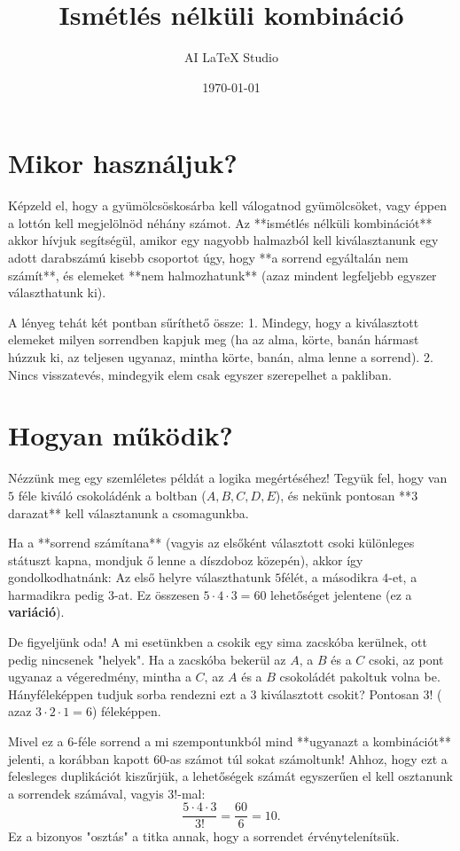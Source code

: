 \documentclass[a4paper,12pt]{article}
\title{Ismétlés nélküli kombináció}
\author{AI LaTeX Studio}
\date{\today}
\theoremstyle{definition} %
\begin{document}
\maketitle

\section{Mikor használjuk?}
Képzeld el, hogy a gyümölcsöskosárba kell válogatnod gyümölcsöket, vagy éppen a lottón kell megjelölnöd néhány számot. Az **ismétlés nélküli kombinációt** akkor hívjuk segítségül, amikor egy nagyobb halmazból kell kiválasztanunk egy adott darabszámú kisebb csoportot úgy, hogy **a sorrend egyáltalán nem számít**, és elemeket **nem halmozhatunk** (azaz mindent legfeljebb egyszer választhatunk ki). 

A lényeg tehát két pontban sűríthető össze: 
1. Mindegy, hogy a kiválasztott elemeket milyen sorrendben kapjuk meg (ha az alma, körte, banán hármast húzzuk ki, az teljesen ugyanaz, mintha körte, banán, alma lenne a sorrend).
2. Nincs visszatevés, mindegyik elem csak egyszer szerepelhet a pakliban.

\section{Hogyan működik?}
Nézzünk meg egy szemléletes példát a logika megértéséhez! Tegyük fel, hogy van $5$ féle kiváló csokoládénk a boltban ($A, B, C, D, E$), és nekünk pontosan **$3$ darazat** kell választanunk a csomagunkba. 

Ha a **sorrend számítana** (vagyis az elsőként választott csoki különleges státuszt kapna, mondjuk ő lenne a díszdoboz közepén), akkor így gondolkodhatnánk:
Az első helyre választhatunk $5$félét, a másodikra $4$-et, a harmadikra pedig $3$-at. Ez összesen $5 \cdot 4 \cdot 3 = 60$ lehetőséget jelentene (ez a \textbf{variáció}).

De figyeljünk oda! A mi esetünkben a csokik egy sima zacskóba kerülnek, ott pedig nincsenek "helyek". Ha a zacskóba bekerül az $A$, a $B$ és a $C$ csoki, az pont ugyanaz a végeredmény, mintha a $C$, az $A$ és a $B$ csokoládét pakoltuk volna be. Hányféleképpen tudjuk sorba rendezni ezt a $3$ kiválasztott csokit? Pontosan $3!$ ( azaz $3 \cdot 2 \cdot 1 = 6$) féleképpen. 

Mivel ez a $6$-féle sorrend a mi szempontunkból mind **ugyanazt a kombinációt** jelenti, a korábban kapott $60$-as számot túl sokat számoltunk! Ahhoz, hogy ezt a felesleges duplikációt kiszűrjük, a lehetőségek számát egyszerűen el kell osztanunk a sorrendek számával, vagyis $3!$-mal:
$$\frac{5 \cdot 4 \cdot 3}{3!} = \frac{60}{6} = 10.$$
Ez a bizonyos "osztás" a titka annak, hogy a sorrendet érvénytelenítsük.
\end{document}
